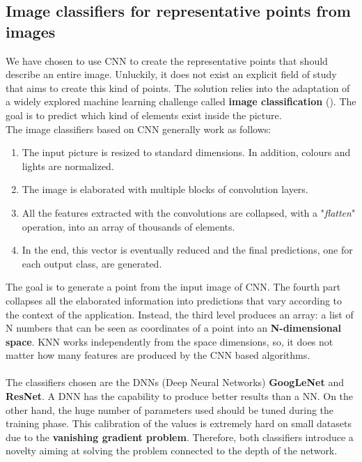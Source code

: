 \subsection{Image classifiers for representative points from images} \label{sec:classifiers}
We have chosen to use CNN to create the representative points that should describe an entire image. Unluckily, it does not exist an explicit field of study that aims to create this kind of points. The solution relies into the adaptation of a widely explored machine learning challenge called \textbf{image classification} (). The goal is to predict which kind of elements exist inside the picture.\\
The image classifiers based on CNN generally work as follows:
\begin{enumerate}
	\item The input picture is resized to standard dimensions. In addition, colours and lights are normalized.
	\item The image is elaborated with multiple blocks of convolution layers.
	\item All the features extracted with the convolutions are collapsed, with a "\textit{flatten}" operation, into an array of thousands of elements.
	\item In the end, this vector is eventually reduced and the final predictions, one for each output class, are generated.
\end{enumerate}
The goal is to generate a point from the input image of CNN. The fourth part collapses all the elaborated information into predictions that vary according to the context of the application. Instead, the third level produces an array: a list of N numbers that can be seen as coordinates of a point into an \textbf{N-dimensional space}. KNN works independently from the space dimensions, so, it does not matter how many features are produced by the CNN based algorithms.\\
\\
The classifiers chosen are the DNNs (Deep Neural Networks) \textbf{GoogLeNet} and \textbf{ResNet}. A DNN has the capability to produce better results than a NN. On the other hand, the huge number of parameters used should be tuned during the training phase. This calibration of the values is extremely hard on small datasets due to the \textbf{vanishing gradient problem}. Therefore, both classifiers introduce a novelty aiming at solving the problem connected to the depth of the network.

